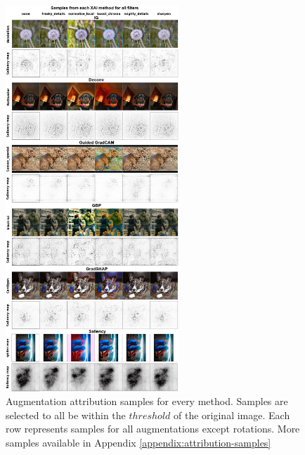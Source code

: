 \begin{figure}[ht]
  \centering
  \includegraphics[width=0.58\textwidth]{results/augment-img/all_methods_samples.png}
  \caption{Augmentation attribution samples for every method. Samples are selected to all be within the $threshold$ of the original image. Each row represents samples for all augmentations except rotations. More samples available in Appendix \ref{appendix:attribution-samples}}\label{fig:attrib-samples}
\end{figure}
